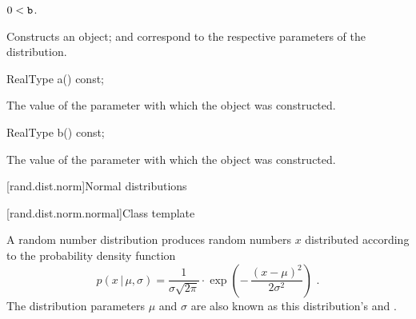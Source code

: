 \begin{itemdescr}
\pnum
\requires $0 < \texttt{b}$.

\pnum
\effects Constructs an  object;
 and 
correspond to the respective parameters of the distribution.
\end{itemdescr}

%
\begin{itemdecl}
RealType a() const;
\end{itemdecl}

\begin{itemdescr}
\pnum\returns The value of the  parameter
 with which the object was constructed.
\end{itemdescr}

%
\begin{itemdecl}
RealType b() const;
\end{itemdecl}

\begin{itemdescr}
\pnum\returns The value of the  parameter
 with which the object was constructed.
\end{itemdescr}%
%



[rand.dist.norm]{Normal distributions}%
%


[rand.dist.norm.normal]{Class template }%
%
%

\pnum
A  random number distribution
produces random numbers $x$
distributed according to
the probability density function%
%
%
\[%
 p(x\,|\,\mu,\sigma)
      = \frac{1}{\sigma \sqrt{2\pi}}
        \cdot
        \exp{\left(- \, \frac{(x - \mu)^2}
                             {2 \sigma^2}
             \right)
            }
 \text{ .}
\]
The distribution parameters $\mu$ and $\sigma$
are also known as this distribution's %
%
and %
%
%
.

